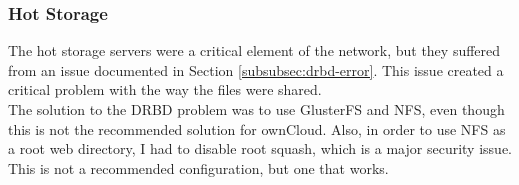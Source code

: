\documentclass[12pt]{spieman}  %
\begin{document}
\subsubsection{Hot Storage}
\label{subsubsec:hot-config}

The hot storage servers were a critical element of the network, but they suffered from an issue documented in Section \ref{subsubsec:drbd-error}. This issue created a critical problem with the way the files were shared.\\

The solution to the DRBD problem was to use GlusterFS and NFS, even though this is not the recommended solution for ownCloud. Also, in order to use NFS as a root web directory, I had to disable root squash, which is a major security issue. This is not a recommended configuration, but one that works.
\end{document}

